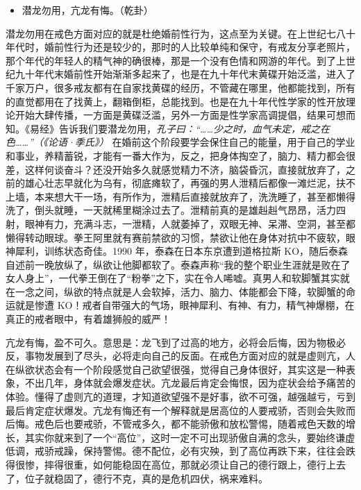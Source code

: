 \begin{itemize}\it
    \item 潜龙勿用，亢龙有悔。（乾卦）
\end{itemize}

潜龙勿用在戒色方面对应的就是杜绝婚前性行为，这点至为关键。在上世纪七八十年代时，婚前性行为还是较少的，那时的人比较单纯和保守，有戒友分享老照片，那个年代的年轻人的精气神的确很棒，那是一个没有色情和网游的年代。到了上世纪九十年代末婚前性开始渐渐多起来了，也是在九十年代末黄碟开始泛滥，进入了千家万户，很多戒友都有在自家找黄碟的经历，不管藏在哪里，他都能找到，所有的直觉都用在了找黄上，翻箱倒柜，总能找到。也是在九十年代性学家的性开放理论开始大肆传播，一方面是黄碟泛滥，另外一方面是性学家高调提倡，结果可想而知。《易经》告诉我们要潜龙勿用，\textit{孔子曰：“……少之时，血气未定，戒之在色……”（《论语·季氏》）} 在婚前这个阶段要学会保住自己的能量，用于自己的学业和事业，养精蓄锐，才能有一番大作为，反之，把身体掏空了，脑力、精力都会很差，这样何谈奋斗？还没开始多久就感觉精力不济，脑袋昏沉，直接就放弃了，之前的雄心壮志早就化为乌有，彻底瘫软了，再强的男人泄精后都像一滩烂泥，扶不上墙，本来想大干一场，有所作为，泄精后直接就放弃了，洗洗睡了，甚至都懒得洗了，倒头就睡，一天就稀里糊涂过去了。泄精前真的是雄赳赳气昂昂，活力四射，眼神有力，充满斗志，一泄精，人就萎掉了，双眼无神、呆滞、空洞，甚至都懒得转动眼球。拳王阿里就有赛前禁欲的习惯，禁欲让他在身体对抗中不疲软，眼神犀利，训练状态奇佳。1990 年，泰森在日本东京遭到道格拉斯 KO，随后泰森自述前一晚放纵了，纵欲让他脚都软了。泰森声称“我的整个职业生涯就是败在了女人身上”，一代拳王倒在了“粉拳”之下，实在令人唏嘘。真男人和软脚蟹其实就在一念之间，纵欲的特点就是人会软掉，活力、脑力、体能都会下降，软脚蟹的命运就是惨遭 KO！戒者自带强大的气场，眼神犀利、有神、有力，精气神爆棚，在真正的戒者眼中，有着雄狮般的威严！

亢龙有悔，盈不可久。意思是：龙飞到了过高的地方，必将会后悔，因为物极必反，事物发展到了尽头，必将走向自己的反面。在戒色方面对应的就是虚则亢，人在纵欲状态会有一个阶段感觉自己欲望很强，觉得自己身体很好，其实这是一种表象，不出几年，身体就会爆发症状。亢龙最后肯定会悔恨，因为症状会给予痛苦的体验。懂得了虚则亢的道理，才知道欲望强不是好事，欲不可强，越强越亏，亏到最后肯定症状爆发。亢龙有悔还有一个解释就是居高位的人要戒骄，否则会失败而后悔。戒色后也要戒骄，不管戒多久，都不能骄傲和放松警惕，随着戒色天数的增长，其实你就来到了一个“高位”，这时一定不可出现骄傲自满的念头，要始终谦虚低调，戒骄戒躁，保持警惕。德不配位，必有灾殃，到了高位再跌下来，往往会跌得很惨，摔得很重，如何能稳固在高位，那就必须让自己的德行跟上，德行上去了，位子就稳固了，德行不克，真的是危机四伏，祸来难料。

